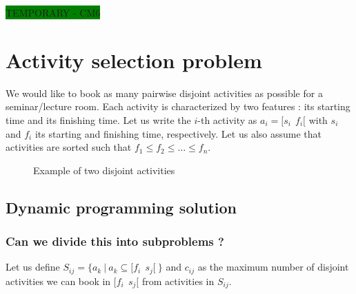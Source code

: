 \colorbox{green}{TEMPORARY - CM6}

\section{Activity selection problem} 
We would like to book as many pairwise disjoint activities as possible for a seminar/lecture room.
Each activity is characterized by two features : its starting time and its finishing time. Let us write the $i$-th activity as $a_i = [s_i \: \:  f_i[$ with $s_i$ and $f_i$ its starting and finishing time, respectively. Let us also assume that activities are sorted such that $f_1 \leq f_2 \leq \ldots \leq f_n$.

\begin{figure}[h!]
\centering
{}
\caption{Example of two disjoint activities}
\end{figure}

\subsection{Dynamic programming solution}
\subsubsection{Can we divide this into subproblems ?}

Let us define $S_{ij} = \{ a_k \: | \: a_k \subseteq [f_i \: \: s_j [ \: \}$ and $c_{ij}$ as the maximum number of disjoint activities we can book in $[f_i \: \: s_j [$  from activities in $S_{ij}$.

